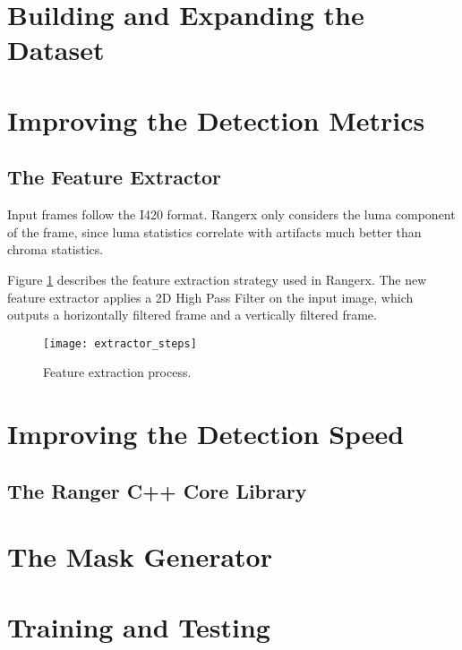 \section{Building and Expanding the Dataset}
\label{sec:sol_dataset}



\section{Improving the Detection Metrics}
\label{sec:sol_metrics}

\subsection{The Feature Extractor}
\label{sec:sol_features}

Input frames follow the I420 format. Rangerx only considers the luma component of the frame, since luma statistics correlate with artifacts much better than chroma statistics.

Figure \ref{fig:extractor_steps} describes the feature extraction strategy used in Rangerx. The new feature extractor applies a 2D High Pass Filter on the input image, which outputs a horizontally filtered frame and a vertically filtered frame.

\begin{figure} [!h]
  \centering
  
  \texttt{[image: extractor\_steps]}
  
  \caption{Feature extraction process. }
  \label{fig:extractor_steps}

\end{figure}

\section{Improving the Detection Speed}
\label{sec:sol_speed}

\subsection{The Ranger C++ Core Library}
\label{sec:sol_rdf}

\section{The Mask Generator}
\label{sec:sol_maskgen}

\section{Training and Testing}
\label{sec:sol_traintest}


